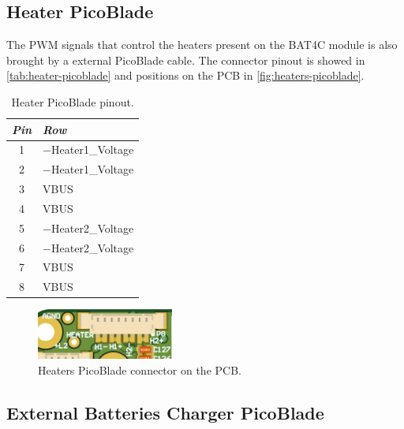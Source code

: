 \subsection{Heater PicoBlade} \label{heater-picoblade}

The PWM signals that control the heaters present on the BAT4C module is also brought by a external PicoBlade cable. The connector pinout is showed in \autoref{tab:heater-picoblade} and positions on the PCB in \autoref{fig:heaters-picoblade}.

\begin{table}[!h]
    \centering
    \begin{tabular}{cl}
        \toprule[1.5pt]
        \textit{Pin} & \textit{Row} \\
        \midrule
        1            & $-$Heater1\_Voltage \\
        2            & $-$Heater1\_Voltage \\
        3            & VBUS \\
        4            & VBUS \\
        5            & $-$Heater2\_Voltage \\
        6            & $-$Heater2\_Voltage \\
        7            & VBUS \\
        8            & VBUS \\
        \bottomrule[1.5pt]
    \end{tabular}
    \caption{Heater PicoBlade pinout.}
    \label{tab:heater-picoblade}
\end{table}

\begin{figure}[!ht]
    \begin{center}
        \includegraphics[width=0.4\textwidth]{figures/heaters-picoblade-3d.png}
        \caption{Heaters PicoBlade connector on the PCB.}
        \label{fig:heaters-picoblade}
    \end{center}
\end{figure}

\subsection{External Batteries Charger PicoBlade} \label{kill-switches-picoblade}


